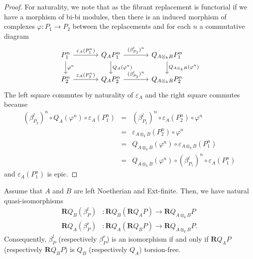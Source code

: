 \begin{proof}
  For naturality, we note that as the fibrant replacement is functorial if we have a morphism of bi-bi modules, then there is an induced morphism of complexes \(\varphi \colon P_1 \to P_2\) between the replacements and for each \(n\) a commutative diagram 
  \[\begin{tikzcd}[column sep=large]
  P_1^n \arrow{d}{\varphi^n}\arrow{r}{\varepsilon_{A}(P_1^n)} & Q_{A} P_1^n\arrow{d}{Q_{A}(\varphi^n)} \arrow{r}{(\beta^l_{P_1})^n} & Q_{A \otimes_k B}P_1^n \arrow{d}{Q_{A \otimes_k B}(\varphi^n)}\\
  P_2^n \arrow{r}{\varepsilon_{A}(P_2^n)} & Q_{A} P_2^n \arrow{r}{(\beta^l_{P_2})^n} & Q_{A \otimes_k B} P_2^n
  \end{tikzcd}\]  The left square commutes by naturality of \(\varepsilon_{A}\) and the right square commutes because
  \begin{eqnarray*}
    (\beta^l_{P_2})^n \circ Q_{A}(\varphi^n) \circ \varepsilon_{A}(P_1^n)
    &=& (\beta^l_{P_2})^n \circ \varepsilon_{A}(P_2^n) \circ \varphi^n\\
    &=&  \varepsilon_{A \otimes_k B}(P_2^n) \circ \varphi^n\\
    &=& Q_{A \otimes_k B}(\varphi^n) \circ \varepsilon_{A \otimes_k B}(P_1^n)\\
    &=& Q_{A \otimes_k B}(\varphi^n) \circ (\beta^l_{P_1})^n \circ \varepsilon_{A}(P_1^n)
  \end{eqnarray*}
  and \(\varepsilon_{A}(P_1^n)\) is epic.
\end{proof}

\begin{proposition} \label{proposition: bi-torsion is a composition}
    Assume that \(A\) and \(B\) are left Noetherian and Ext-finite. Then, we have natural quasi-isomorphisms 
  \begin{align*}
    \mathbf{R}Q_B(\beta^l_P) & : \mathbf{R}Q_B(\mathbf{R}Q_A P) \to \mathbf{R}Q_{A \otimes_k B} P \\
    \mathbf{R}Q_A(\beta^r_P) & : \mathbf{R}Q_A(\mathbf{R}Q_B P) \to \mathbf{R}Q_{A \otimes_k B} P.
  \end{align*}
  Consequently, \(\beta^l_P\) (respectively \(\beta^r_P\)) is an isomorphism if and only if \(\mathbf{R}Q_A P\) (respectively \(\mathbf{R}Q_B P\)) is \(Q_B\) (respectively \(Q_A\)) torsion-free.
\end{proposition}


